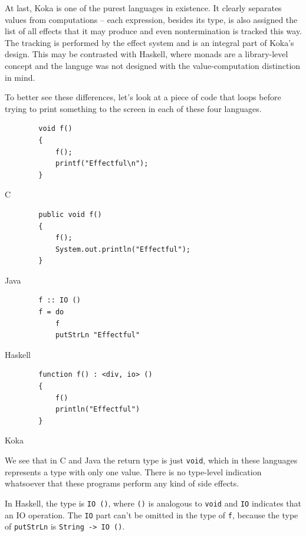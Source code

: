 \documentclass[declaration,inz,english,shortabstract]{iithesis}
\newcommand{\m}[1]{\texttt{#1}}
\begin{document}
At last, Koka \cite{Koka} is one of the purest languages in existence. It clearly separates values from computations -- each expression, besides its type, is also assigned the list of all effects that it may produce and even nontermination is tracked this way. The tracking is performed by the effect system and is an integral part of Koka's design. This may be contrasted with Haskell, where monads are a library-level concept and the languge was not designed with the value-computation distinction in mind.

To better see these differences, let's look at a piece of code that loops before trying to print something to the screen in each of these four languages.

\begin{listing}[H]
    \begin{verbatim}
        void f()
        {
            f();
            printf("Effectful\n");
        }
    \end{verbatim}
    \caption{C}
\end{listing}

\begin{listing}[H]
    \begin{verbatim}
        public void f()
        {
            f();
            System.out.println("Effectful");
        }
    \end{verbatim}
    \caption{Java}
\end{listing}

\begin{listing}[H]
    \begin{verbatim}
        f :: IO ()
        f = do
            f
            putStrLn "Effectful"
    \end{verbatim}
    \caption{Haskell}
\end{listing}

\begin{listing}[H]
    \begin{verbatim}
        function f() : <div, io> ()
        {
            f()
            println("Effectful")
        }
    \end{verbatim}
    \caption{Koka}
\end{listing}

We see that in C and Java the return type is just \m{void}, which in these languages represents a type with only one value. There is no type-level indication whatsoever that these programs perform any kind of side effects.

In Haskell, the type is \m{IO ()}, where \m{()} is analogous to \m{void} and \m{IO} indicates that an IO operation. The \m{IO} part can't be omitted in the type of \m{f}, because the type of \m{putStrLn} is \m{String -> IO ()}.
\end{document}
